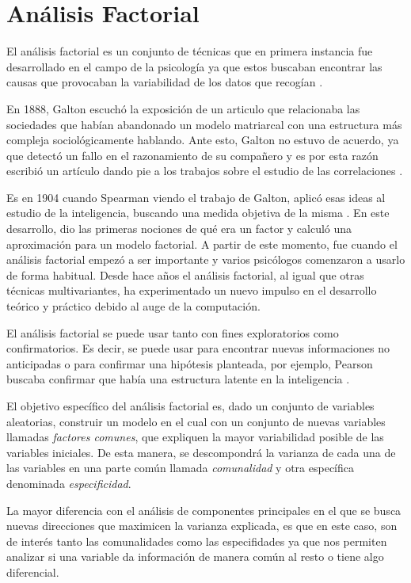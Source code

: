 \newpage
\section{Análisis Factorial}

\noindent El análisis factorial es un conjunto de técnicas que en primera instancia fue desarrollado en el campo de la psicología ya que estos buscaban encontrar las causas que provocaban la variabilidad de los datos que recogían \cite{Vincent 1953}. 

\noindent En 1888, Galton escuchó la exposición de un articulo que relacionaba las sociedades que habían abandonado un modelo matriarcal con una estructura más compleja sociológicamente hablando. Ante esto, Galton no estuvo de acuerdo, ya que detectó un fallo en el razonamiento de su compañero y es por esta razón escribió un artículo  dando pie a los trabajos sobre el estudio de las correlaciones \cite{Galton 1889}.   

\noindent Es en 1904 cuando Spearman  viendo el trabajo de Galton, aplicó esas ideas al estudio de la inteligencia, buscando una medida objetiva de la misma \cite{Spearman 1904}. En este desarrollo, dio las primeras nociones de qué era un factor y calculó una aproximación para un modelo factorial. A partir de este momento, fue cuando el análisis factorial empezó a ser importante y varios psicólogos comenzaron a usarlo de forma habitual. 
Desde hace años el análisis factorial, al igual que otras técnicas multivariantes, ha experimentado un nuevo impulso en el desarrollo teórico y práctico debido al auge de la computación. 

\noindent El análisis factorial se puede usar tanto con fines exploratorios como confirmatorios. Es decir, se puede usar para encontrar nuevas informaciones no anticipadas o para confirmar una hipótesis planteada, por ejemplo, Pearson buscaba confirmar que había una estructura latente en la inteligencia \cite{Hair 1995}.

\noindent El objetivo específico del análisis factorial es, dado un conjunto de variables aleatorias, construir un modelo en el cual con un conjunto de nuevas variables llamadas \emph{factores comunes}, que expliquen la mayor variabilidad posible de las variables iniciales. De esta manera, se descompondrá la varianza de cada una de las variables en una parte común llamada \emph{comunalidad}  y otra específica denominada \emph{especificidad}. 

\noindent La mayor diferencia con el análisis de componentes principales en el que se busca nuevas direcciones que maximicen la varianza explicada, es que en este caso, son de interés tanto las comunalidades como las especifidades ya que nos permiten analizar si una variable da información de manera común al resto o tiene algo diferencial. 

